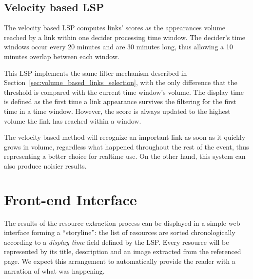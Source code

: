 \documentclass{sig-alternate}
\begin{document}
\subsection{Velocity based LSP}
\label{sec:velocity_based_links_selection}
The velocity based LSP computes links' scores as the appearances volume reached by a link within one decider processing time window. The decider's time windows occur every 20 minutes and are 30 minutes long, thus allowing a 10 minutes overlap between each window.

This LSP implements the same filter mechanism described in Section~\ref{sec:volume_based_links_selection}, with the only difference that the threshold is compared with the current time window's volume. The display time is defined as the first time a link appearance survives the filtering for the first time in a time window. However, the score is always updated to the highest volume the link has reached within a window.

The velocity based method will recognize an important link as soon as it quickly grows in volume, regardless what happened throughout the rest of the event, thus representing a better choice for realtime use. On the other hand, this system can also produce noisier results.


\section{Front-end Interface}
\label{sec:front-end-interface}
The results of the resource extraction process can be displayed in a simple web interface forming a ``storyline'': the list of resources are sorted chronologically according to a \emph{display time} field defined by the LSP. Every resource will be represented by its title, description and an image extracted from the referenced page. We expect this arrangement to automatically provide the reader with a narration of what was happening.
\end{document}
